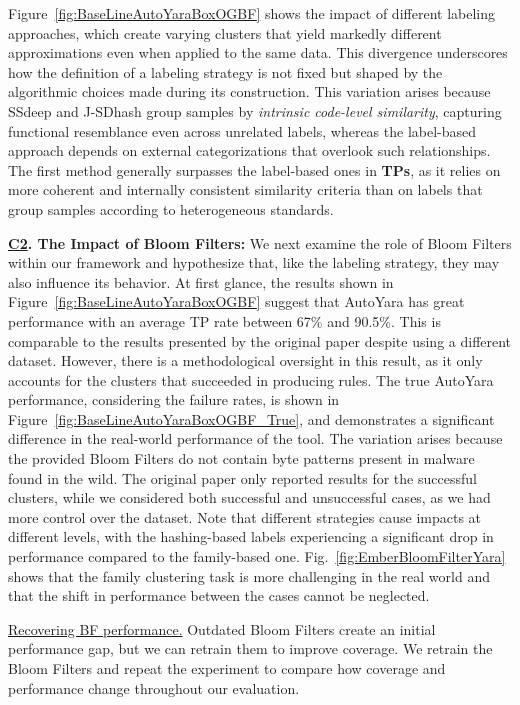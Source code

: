  \noindent Figure~\ref{fig:BaseLineAutoYaraBoxOGBF} shows the impact of different labeling approaches, which create varying clusters that yield markedly different approximations even when applied to the same data. This divergence underscores how the definition of a labeling strategy is not fixed but shaped by the algorithmic choices made during its construction. This variation arises because SSdeep and J-SDhash group samples by \textit{intrinsic code-level similarity}, capturing functional resemblance even across unrelated labels, whereas the label-based approach depends on external categorizations that overlook such relationships. The first method generally surpasses the label-based ones in \textbf{TPs}, as it relies on more coherent and internally consistent similarity criteria than on labels that group samples according to heterogeneous standards.

\noindent\textbf{\underline{C2}. The Impact of Bloom Filters:} 
We next examine the role of Bloom Filters within our framework and hypothesize that, like the labeling strategy, they may also influence its behavior. At first glance, the results shown in Figure~\ref{fig:BaseLineAutoYaraBoxOGBF} suggest that AutoYara has great performance with an average TP rate between 67\% and 90.5\%. This is comparable to the results presented by the original paper despite using a different dataset. However, there is a methodological oversight in this result, as it only accounts for the clusters that succeeded in producing rules. The true AutoYara performance, considering the failure rates, is shown in Figure~\ref{fig:BaseLineAutoYaraBoxOGBF_True}, and demonstrates a significant difference in the real-world performance of the tool. The variation arises because the provided Bloom Filters do not contain byte patterns present in malware found in the wild. The original paper only reported results for the successful clusters, while we considered both successful and unsuccessful cases, as we had more control over the dataset. Note that different strategies cause impacts at different levels, with the hashing-based labels experiencing a significant drop in performance compared to the family-based one. Fig.~\ref{fig:EmberBloomFilterYara} shows that the family clustering task is more challenging in the real world and that the shift in performance between the cases cannot be neglected. 


\uline{Recovering BF performance.} Outdated Bloom Filters create an initial performance gap, but we can retrain them to improve coverage. We retrain the Bloom Filters and repeat the experiment to compare how coverage and performance change throughout our evaluation.

